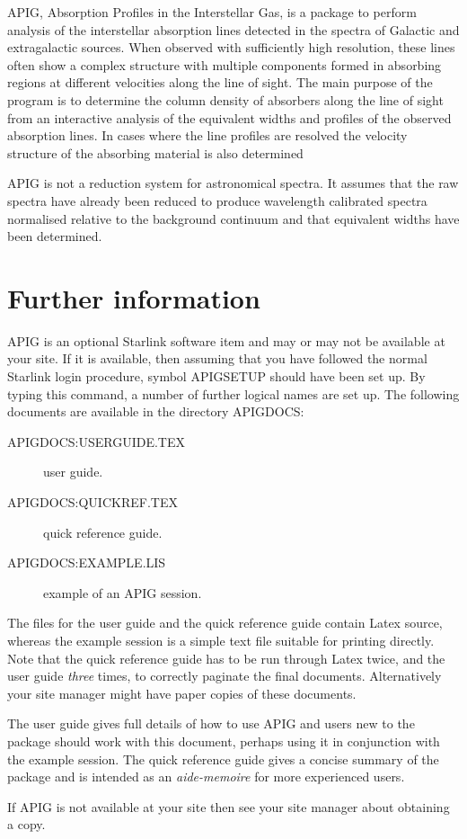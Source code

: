 APIG, Absorption Profiles in the Interstellar Gas, is a package to
perform analysis of the interstellar 
absorption lines detected in the spectra of Galactic and extragalactic 
sources. When observed with sufficiently high resolution, these lines 
often show a complex structure with multiple components formed in 
absorbing regions at different velocities along the line of sight. The 
main purpose of the program is to determine the column density of 
absorbers along the line of sight from an interactive analysis of the 
equivalent widths and profiles of the observed absorption lines. In 
cases where the line profiles are resolved the velocity structure
of the absorbing material is also determined

APIG is not a reduction system for astronomical spectra. It assumes
that the raw spectra have already been reduced to produce wavelength
calibrated spectra normalised relative to the background continuum and
that equivalent widths have been determined.

\section{Further information}

APIG is an optional Starlink software item and may or may not be 
available at your site. If it is available, then assuming that you have
followed the normal Starlink login procedure, symbol APIGSETUP
should have been set up. By typing this command, a number of further logical
names are set up. The following documents are available in the directory
APIGDOCS:

\begin{description}

  \item [APIGDOCS:USERGUIDE.TEX] user guide.

  \item [APIGDOCS:QUICKREF.TEX] quick reference guide.

  \item [APIGDOCS:EXAMPLE.LIS] example of an APIG session.

\end{description}

The files for the user guide and the quick reference guide contain
Latex source, whereas the example session is a simple text file suitable
for printing directly. Note that the quick reference guide has to be run
through Latex twice, and the user guide {\em three} times, to correctly
paginate the final documents. Alternatively your site manager might
have paper copies of these documents.

The user guide gives full details of how to use APIG and users new to
the package should work with this document, perhaps using it in 
conjunction with the example session. The quick reference guide gives
a concise summary of the package and is intended as an {\it
aide-memoire} for more experienced users.

If APIG is not available at your site then see your site manager about
obtaining a copy.


